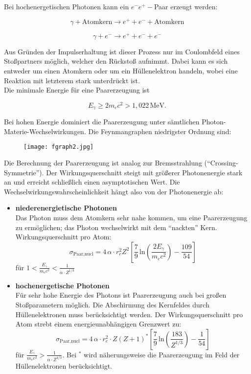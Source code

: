 Bei hochenergetischen Photonen kann ein $e^-e^+-$Paar erzeugt werden:

\[\gamma + \text{Atomkern} \longrightarrow e^+ + e^- +  \text{Atomkern} \]

\[\gamma + e^- \longrightarrow e^+ + e^- +  e^- \]

Aus Gründen der Impulserhaltung ist dieser Prozess nur im Coulombfeld eines Stoßpartners möglich,
welcher den Rückstoß aufnimmt. Dabei kann es sich entweder um einen Atomkern oder um ein
Hüllenelektron handeln, wobei eine Reaktion mit letzterem stark unterdrückt ist. 
\\
Die minimale Energie für eine Paarerzeugung ist

\[ E_\gamma \geq 2m_ec^2 > 1{,}022\,\text{MeV}. \]

Bei hohen Energie dominiert die Paarerzeugung unter sämtlichen Photon-Materie-Wechselwirkungen. Die
Feynmangraphen niedrigster Ordnung sind:

\begin{figure}[H]
	\centering
	\texttt{[image: fgraph2.jpg]}
\end{figure}

Die Berechnung der Paarerzeugung ist analog zur Bremsstrahlung ("`Crossing-Symmetrie"'). Der
Wirkungsquerschnitt steigt mit größerer Photonenergie stark an und erreicht schließlich einen
asymptotischen Wert. Die Wechselwirkungswahrscheinlichkeit hängt also von der Photonenergie ab:

\begin{itemize}
  \item \textbf{niederenergietische Photonen}\\
  Das Photon muss dem Atomkern sehr nahe kommen, um eine Paarerzeugung zu ermöglichen; das Photon
  wechselwirkt mit dem "`nackten"' Kern. Wirkungsquerschnitt pro Atom:
  \[\sigma_{\text{Paar,nucl}} = 4\,\alpha\cdot r_e^2 Z^2
  \left[\frac{7}{9}\,\text{ln}\left(\frac{2E_\gamma}{m_ec^2}\right)-\frac{109}{54}  \right]  \]
  für $1< \frac{E_\gamma}{m_ec^2} < \frac{1}{\alpha\cdot Z^{1/3}}$
  \item \textbf{hochenergetische Photonen}\\
  Für sehr hohe Energie des Photons ist Paarerzeugung auch bei großen Stoßparametern möglich. Die
  Abschirmung des Kernfeldes durch Hüllen\-elektronen muss berücksichtigt werden. Der
  Wirkungsquerschnitt pro Atom strebt einem energieunabhängigen Grenzwert zu:
  \[\sigma_{\text{Paar,nucl}} = 4\,\alpha\cdot r_e^2\cdot Z(Z+1)^*
  \left[\frac{7}{9}\,\text{ln}\left(\frac{183}{Z^{1/3}}\right)-\frac{1}{54}  \right]  \]
  für $\frac{E_\gamma}{m_ec^2} > \frac{1}{\alpha\cdot Z^{1/3}}$. Bei $^*$ wird näherungsweise die
  Paarerzeugung im Feld der Hüllenelektronen berücksichtigt.
\end{itemize}


